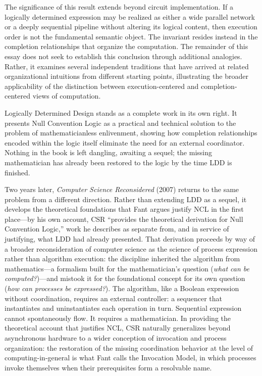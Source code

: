 \documentclass[12pt, a4paper]{article}
\begin{document}
The significance of this result extends beyond circuit
implementation. If a logically determined expression may be
realized as either a wide parallel network or a deeply sequential
pipeline without altering its logical content, then execution
order is not the fundamental semantic object. The invariant
resides instead in the completion relationships that organize the
computation. The remainder of this essay does not seek to
establish this conclusion through additional analogies. Rather, it
examines several independent traditions that have arrived at
related organizational intuitions from different starting points,
illustrating the broader applicability of the distinction between
execution-centered and completion-centered views of computation.

Logically Determined Design stands as a complete work in its own
right. It presents Null Convention Logic as a practical and
technical solution to the problem of mathematicianless
enlivenment, showing how completion relationships encoded within
the logic itself eliminate the need for an external coordinator.
Nothing in the book is left dangling, awaiting a sequel; the
missing mathematician has already been restored to the logic by
the time LDD is finished.

Two years later, \textit{Computer Science Reconsidered} (2007)
returns to the same problem from a different direction. Rather
than extending LDD as a sequel, it develops the theoretical
foundations that Fant argues justify NCL in the first place---by
his own account, CSR ``provides the theoretical derivation for
Null Convention Logic,'' work he describes as separate from, and
in service of justifying, what LDD had already presented. That derivation proceeds by way of a broader
reconsideration of computer science as the science of process
expression rather than algorithm execution: the discipline
inherited the algorithm from mathematics---a formalism built for
the mathematician's question (\emph{what can be computed?})---and
mistook it for the foundational concept for its own question
(\emph{how can processes be expressed?}). The algorithm, like a
Boolean expression without coordination, requires an external
controller: a sequencer that instantiates and uninstantiates each
operation in turn. Sequential expression cannot spontaneously
flow. It requires a mathematician. In providing the theoretical
account that justifies NCL, CSR naturally generalizes beyond
asynchronous hardware to a wider conception of invocation and
process organization: the restoration of the missing coordination
behavior at the level of computing-in-general is what Fant calls
the Invocation Model, in which processes invoke themselves when
their prerequisites form a resolvable name.
\end{document}
